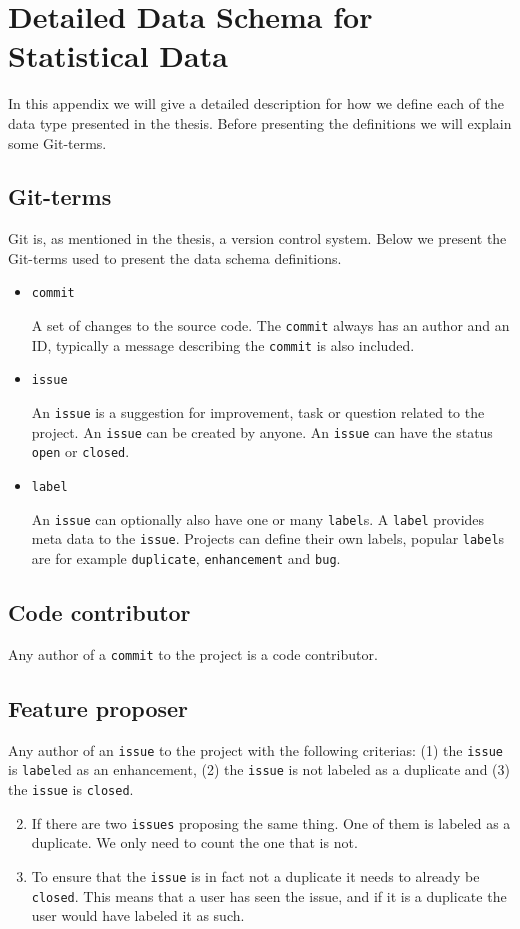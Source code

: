 \section{Detailed Data Schema for Statistical Data}
\label{ap:detailed_data}
In this appendix we will give a detailed description for how we define each of the data type presented in the thesis. Before presenting the definitions we will explain some Git-terms.

\subsection*{Git-terms}
Git is, as mentioned in the thesis, a version control system. Below we present the Git-terms used to present the data schema definitions.

\begin{itemize}
	\item\texttt{commit}

	A set of changes to the source code. The \texttt{commit} always has an author and an ID, typically a message describing the \texttt{commit} is also included.
	\item\texttt{issue}

	An \texttt{issue} is a suggestion for improvement, task or question related to the project. An \texttt{issue} can be created by anyone. An \texttt{issue} can have the status \texttt{open} or \texttt{closed}.

	\item\texttt{label}

	An \texttt{issue} can optionally also have one or many \texttt{label}s. A \texttt{label} provides meta data to the \texttt{issue}. Projects can define their own labels, popular \texttt{label}s are for example \texttt{duplicate}, \texttt{enhancement} and \texttt{bug}.
\end{itemize}

\subsection*{Code contributor}
Any author of a \texttt{commit} to the project is a code contributor.
\subsection*{Feature proposer}
Any author of an \texttt{issue} to the project with the following criterias: (1) the \texttt{issue} is \texttt{label}ed as an enhancement, (2) the \texttt{issue} is not labeled as a duplicate and (3) the \texttt{issue} is \texttt{closed}.
\begin{enumerate}
	\setcounter{enumi}{1}
	\item If there are two \texttt{issues} proposing the same thing. One of them is labeled as a duplicate. We only need to count the one that is not.
	\item To ensure that the \texttt{issue} is in fact not a duplicate it needs to already be \texttt{closed}. This means that a user has seen the issue, and if it is a duplicate the user would have labeled it as such.
\end{enumerate}
